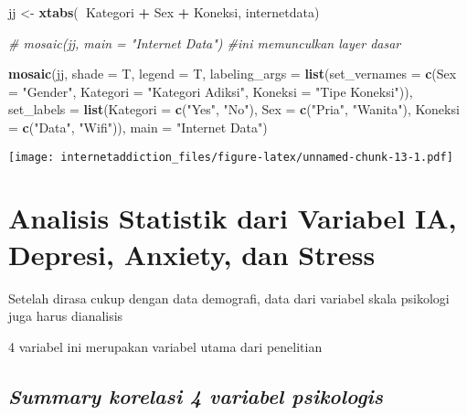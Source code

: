 \documentclass[
]{article}
\newenvironment{Shaded}{\begin{snugshade}}{\end{snugshade}}
\newcommand{\CommentTok}[1]{\textcolor[rgb]{0.56,0.35,0.01}{\textit{#1}}}
\newcommand{\DataTypeTok}[1]{\textcolor[rgb]{0.13,0.29,0.53}{#1}}
\newcommand{\KeywordTok}[1]{\textcolor[rgb]{0.13,0.29,0.53}{\textbf{#1}}}
\newcommand{\NormalTok}[1]{#1}
\newcommand{\OperatorTok}[1]{\textcolor[rgb]{0.81,0.36,0.00}{\textbf{#1}}}
\newcommand{\StringTok}[1]{\textcolor[rgb]{0.31,0.60,0.02}{#1}}
\begin{document}
\begin{Shaded}
\begin{Highlighting}[]
\NormalTok{jj <-}\StringTok{ }\KeywordTok{xtabs}\NormalTok{(}\OperatorTok{~}\NormalTok{Kategori }\OperatorTok{+}\StringTok{ }\NormalTok{Sex }\OperatorTok{+}\StringTok{ }\NormalTok{Koneksi, internetdata)}

\CommentTok{# mosaic(jj, main = "Internet Data") #ini memunculkan layer dasar }

\KeywordTok{mosaic}\NormalTok{(jj, }
       \DataTypeTok{shade =}\NormalTok{ T,}
       \DataTypeTok{legend =}\NormalTok{ T,}
       \DataTypeTok{labeling_args =} \KeywordTok{list}\NormalTok{(}\DataTypeTok{set_vernames =} \KeywordTok{c}\NormalTok{(}\DataTypeTok{Sex =} \StringTok{"Gender"}\NormalTok{,}
                                             \DataTypeTok{Kategori =} \StringTok{"Kategori Adiksi"}\NormalTok{,}
                                             \DataTypeTok{Koneksi =} \StringTok{"Tipe Koneksi"}\NormalTok{)),}
       \DataTypeTok{set_labels =} \KeywordTok{list}\NormalTok{(}\DataTypeTok{Kategori =} \KeywordTok{c}\NormalTok{(}\StringTok{"Yes"}\NormalTok{, }\StringTok{"No"}\NormalTok{),}
                         \DataTypeTok{Sex =} \KeywordTok{c}\NormalTok{(}\StringTok{"Pria"}\NormalTok{, }\StringTok{"Wanita"}\NormalTok{),}
                         \DataTypeTok{Koneksi =} \KeywordTok{c}\NormalTok{(}\StringTok{"Data"}\NormalTok{, }\StringTok{"Wifi"}\NormalTok{)),}
       \DataTypeTok{main =} \StringTok{"Internet Data"}\NormalTok{)}
\end{Highlighting}
\end{Shaded}

\texttt{[image: internetaddiction\_files/figure-latex/unnamed-chunk-13-1.pdf]}

\hypertarget{analisis-statistik-dari-variabel-ia-depresi-anxiety-dan-stress}{%
\section{\texorpdfstring{\textbf{Analisis Statistik dari Variabel IA,
Depresi, Anxiety, dan
Stress}}{Analisis Statistik dari Variabel IA, Depresi, Anxiety, dan Stress}}\label{analisis-statistik-dari-variabel-ia-depresi-anxiety-dan-stress}}

Setelah dirasa cukup dengan data demografi, data dari variabel skala
psikologi juga harus dianalisis

4 variabel ini merupakan variabel utama dari penelitian

\hypertarget{summary-korelasi-4-variabel-psikologis}{%
\subsection{\texorpdfstring{\emph{Summary korelasi 4 variabel
psikologis}}{Summary korelasi 4 variabel psikologis}}\label{summary-korelasi-4-variabel-psikologis}}
\end{document}
